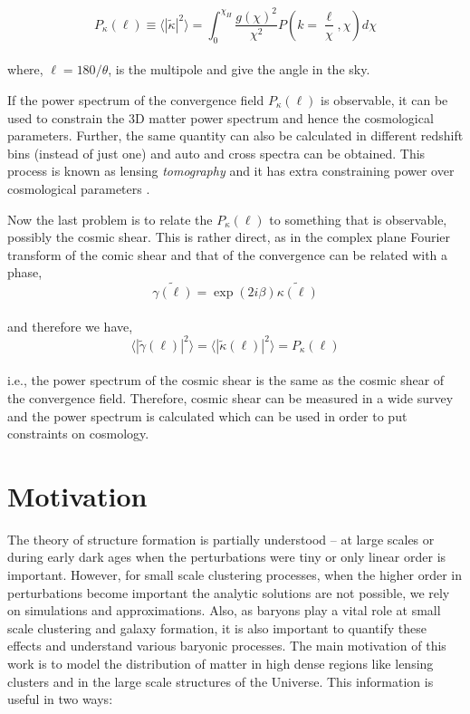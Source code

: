 \begin{equation}
	P_{\kappa}(\ell) \equiv \langle |\tilde{\kappa}|^2 \rangle = 
			\int_0^{\chi_H} \dfrac{g(\chi)^2}{\chi^2} 
			P\left(k=\dfrac{\ell}{\chi},\chi \right) d\chi
\end{equation}
\\
where, $\ell = 180/\theta$, is the multipole and give the angle in the sky. 

If the power spectrum of the convergence field $P_{\kappa}(\ell)$ is observable, it can be
used to constrain the 3D matter power spectrum and hence the cosmological parameters. Further,
the same quantity can also be calculated in different redshift bins (instead of just one) and
auto and cross spectra can be obtained. This process is known as 
lensing {\it tomography} and it has extra constraining power over cosmological parameters
\cite{1999ApJ...522L..21H,2004MNRAS.348..897T}.

Now the last problem is to relate the $P_{\kappa}(\ell)$ to something that is observable, 
possibly the cosmic shear. This is rather direct, as in the complex plane Fourier transform
of the comic shear and that of the
convergence can be related with a phase,
\begin{equation}
	\tilde{\gamma(\ell)} = \exp(2i\beta) \tilde{\kappa(\ell)}
\end{equation}
\\
and therefore we have,
\begin{equation}
	\langle |\tilde{\gamma}(\ell)|^2 \rangle = 
	\langle |\tilde{\kappa}(\ell)|^2 \rangle = P_{\kappa}(\ell)
\end{equation}
\\
i.e., the power spectrum of the cosmic shear is the same as the cosmic shear of the
convergence field. Therefore, cosmic shear can be measured in a wide survey and the 
power spectrum is calculated which can be used in order to put constraints on
cosmology.




\section{Motivation}

The theory of structure formation is partially understood --  at large scales 
or during early dark ages when the perturbations were tiny or only linear order is important. 
However, for small scale clustering processes, when the higher order in perturbations 
become important the analytic solutions are not possible, we rely on simulations and 
approximations. Also, as baryons play a vital role at small scale clustering
and galaxy formation, it is also important to quantify these effects and 
understand various baryonic processes. 
The main motivation of this work is to model the distribution of matter in high dense
regions like lensing clusters and in the large scale structures of the Universe. 
This information is useful in two ways: 

